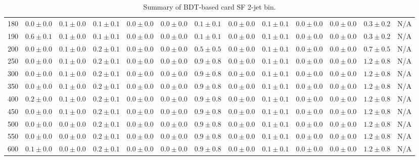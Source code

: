 \begin{table}
{\begin{center}
\begin{tabular}{l | c c | c c c c c c c c  | c c}
180 & $0.0\pm0.0$ & $0.1\pm0.0$ & $0.1\pm0.1$ & $0.0\pm0.0$ & $0.0\pm0.0$ & $0.1\pm0.1$ & $0.0\pm0.0$ & $0.1\pm0.1$ & $0.0\pm0.0$ & $0.0\pm0.0$ & $0.3\pm0.2$ &  N/A \\
190 & $0.6\pm0.1$ & $0.1\pm0.0$ & $0.1\pm0.1$ & $0.0\pm0.0$ & $0.0\pm0.0$ & $0.1\pm0.1$ & $0.0\pm0.0$ & $0.1\pm0.1$ & $0.0\pm0.0$ & $0.0\pm0.0$ & $0.3\pm0.2$ &  N/A \\
200 & $0.0\pm0.0$ & $0.1\pm0.0$ & $0.2\pm0.1$ & $0.0\pm0.0$ & $0.0\pm0.0$ & $0.5\pm0.5$ & $0.0\pm0.0$ & $0.1\pm0.1$ & $0.0\pm0.0$ & $0.0\pm0.0$ & $0.7\pm0.5$ &  N/A \\
250 & $0.0\pm0.0$ & $0.1\pm0.0$ & $0.2\pm0.1$ & $0.0\pm0.0$ & $0.0\pm0.0$ & $0.9\pm0.8$ & $0.0\pm0.0$ & $0.1\pm0.1$ & $0.0\pm0.0$ & $0.0\pm0.0$ & $1.2\pm0.8$ &  N/A \\
300 & $0.0\pm0.0$ & $0.1\pm0.0$ & $0.2\pm0.1$ & $0.0\pm0.0$ & $0.0\pm0.0$ & $0.9\pm0.8$ & $0.0\pm0.0$ & $0.1\pm0.1$ & $0.0\pm0.0$ & $0.0\pm0.0$ & $1.2\pm0.8$ &  N/A \\
350 & $0.0\pm0.0$ & $0.1\pm0.0$ & $0.2\pm0.1$ & $0.0\pm0.0$ & $0.0\pm0.0$ & $0.9\pm0.8$ & $0.0\pm0.0$ & $0.1\pm0.1$ & $0.0\pm0.0$ & $0.0\pm0.0$ & $1.2\pm0.8$ &  N/A \\
400 & $0.2\pm0.0$ & $0.1\pm0.0$ & $0.2\pm0.1$ & $0.0\pm0.0$ & $0.0\pm0.0$ & $0.9\pm0.8$ & $0.0\pm0.0$ & $0.1\pm0.1$ & $0.0\pm0.0$ & $0.0\pm0.0$ & $1.2\pm0.8$ &  N/A \\
450 & $0.0\pm0.0$ & $0.1\pm0.0$ & $0.2\pm0.1$ & $0.0\pm0.0$ & $0.0\pm0.0$ & $0.9\pm0.8$ & $0.0\pm0.0$ & $0.1\pm0.1$ & $0.0\pm0.0$ & $0.0\pm0.0$ & $1.2\pm0.8$ &  N/A \\
500 & $0.0\pm0.0$ & $0.0\pm0.0$ & $0.2\pm0.1$ & $0.0\pm0.0$ & $0.0\pm0.0$ & $0.9\pm0.8$ & $0.0\pm0.0$ & $0.1\pm0.1$ & $0.0\pm0.0$ & $0.0\pm0.0$ & $1.2\pm0.8$ &  N/A \\
550 & $0.0\pm0.0$ & $0.0\pm0.0$ & $0.2\pm0.1$ & $0.0\pm0.0$ & $0.0\pm0.0$ & $0.9\pm0.8$ & $0.0\pm0.0$ & $0.1\pm0.1$ & $0.0\pm0.0$ & $0.0\pm0.0$ & $1.2\pm0.8$ &  N/A \\
600 & $0.1\pm0.0$ & $0.0\pm0.0$ & $0.2\pm0.1$ & $0.0\pm0.0$ & $0.0\pm0.0$ & $0.9\pm0.8$ & $0.0\pm0.0$ & $0.1\pm0.1$ & $0.0\pm0.0$ & $0.0\pm0.0$ & $1.2\pm0.8$ &  N/A \\
\hline
\end{tabular}
\end{center}
}
\caption{Summary of BDT-based card SF 2-jet bin.}
\end{table}
